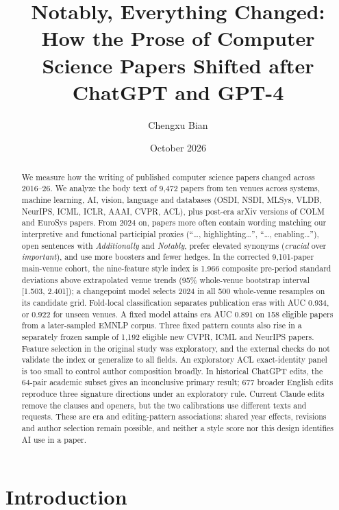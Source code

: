 \documentclass[10pt,twocolumn]{article}
\title{\textbf{Notably, Everything Changed:\\ How the Prose of Computer Science Papers Shifted after ChatGPT and GPT-4}}
\author{Chengxu Bian}
\date{October 2026}
\begin{document}
\maketitle

\begin{abstract}
We measure how the writing of published computer science papers changed across 2016--26. We analyze the body text of 9,472 papers from ten venues across systems, machine learning, AI, vision, language and databases (OSDI, NSDI, MLSys, VLDB, NeurIPS, ICML, ICLR, AAAI, CVPR, ACL), plus post-era arXiv versions of COLM and EuroSys papers. From 2024 on, papers more often contain wording matching our interpretive and functional participial proxies (``\ldots, highlighting\ldots'', ``\ldots, enabling\ldots''), open sentences with \textit{Additionally} and \textit{Notably}, prefer elevated synonyms (\textit{crucial} over \textit{important}), and use more boosters and fewer hedges. In the corrected 9,101-paper main-venue cohort, the nine-feature style index is 1.966 composite pre-period standard deviations above extrapolated venue trends (95\% whole-venue bootstrap interval [1.503, 2.401]); a changepoint model selects 2024 in all 500 whole-venue resamples on its candidate grid. Fold-local classification separates publication eras with AUC 0.934, or 0.922 for unseen venues. A fixed model attains era AUC 0.891 on 158 eligible papers from a later-sampled EMNLP corpus. Three fixed pattern counts also rise in a separately frozen sample of 1,192 eligible new CVPR, ICML and NeurIPS papers. Feature selection in the original study was exploratory, and the external checks do not validate the index or generalize to all fields. An exploratory ACL exact-identity panel is too small to control author composition broadly. In historical ChatGPT edits, the 64-pair academic subset gives an inconclusive primary result; 677 broader English edits reproduce three signature directions under an exploratory rule. Current Claude edits remove the clauses and openers, but the two calibrations use different texts and requests. These are era and editing-pattern associations: shared year effects, revisions and author selection remain possible, and neither a style score nor this design identifies AI use in a paper.
\end{abstract}

\section{Introduction}
\end{document}
